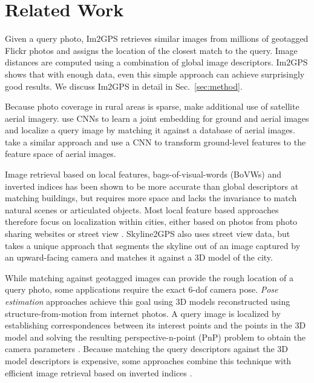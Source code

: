 \documentclass[10pt,twocolumn,letterpaper]{article}
\begin{document}
\section{Related Work}
\label{sec:relwork}
Given a query photo, Im2GPS \cite{Hays08CVPR,Hays14MLEVI} retrieves
similar images from millions of geotagged Flickr photos and assigns
the location of the closest match to the query. Image distances are
computed using a combination of global image descriptors. Im2GPS
shows that with enough data, even this simple approach can achieve
surprisingly good results. We discuss Im2GPS in detail in
Sec.~\ref{sec:method}.

Because photo coverage in rural areas is sparse,
\cite{Lin13CVPR,Lin15CVPR} make additional use of satellite aerial
imagery. \cite{Lin15CVPR} use CNNs to learn a joint embedding for
ground and aerial images and localize a query image by matching it
against a database of aerial images.
\cite{Workman15ICCV} take a similar approach and use a CNN to
transform ground-level features to the feature space of aerial images.

Image retrieval based on local features, bags-of-visual-words (BoVWs)
and inverted indices \cite{Nister06CVPR,Sivic03ICCV} has been shown to
be more accurate than global descriptors at matching buildings,
but requires more space and lacks the invariance to match \eg natural scenes or articulated objects. Most local feature based
approaches therefore focus on localization within cities, either based
on photos from photo sharing websites \cite{Cao15IJCV,Philbin07CVPR}
or street view
\cite{Baatz10ECCV,Chen11CVPR,Kim15ICCV,Knopp10ECCV,Schindler07CVPR,Zamir10ECCV,Zamir14PAMI}.
Skyline2GPS \cite{Ramalingam10IROS} also uses street view data, but
takes a unique approach that segments the skyline out of an image
captured by an upward-facing camera and matches it against a 3D model
of the city.

While matching against geotagged images can provide the rough location
of a query photo, some applications require the exact 6-dof camera
pose. \emph{Pose estimation} approaches achieve this goal using 3D
models reconstructed using structure-from-motion from internet photos.
A query image is localized by establishing correspondences between its
interest points and the points in the 3D model and solving the
resulting perspective-n-point (PnP) problem to obtain the camera
parameters
\cite{Li10ECCV,Li12ECCV,Sattler11ICCV}. Because matching the query
descriptors against the 3D model descriptors is expensive, some
approaches combine this technique with efficient image retrieval based
on inverted indices \cite{Cao15IJCV,Irschara09CVPR,Sattler12BMVC}.
\end{document}
